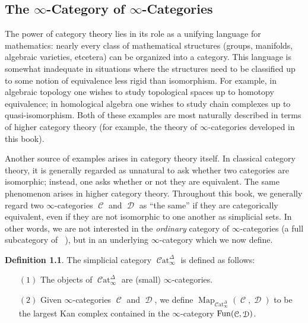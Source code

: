 \documentclass{report}[10pt, final]
\DeclareMathOperator{\bHom}{{Map}}
\DeclareMathOperator{\sSet}{\mathcal{S}et_{\Delta}}
\DeclareMathOperator{\Cat}{\mathcal{C}at}
\DeclareMathOperator{\calC}{\mathcal{C}}
\DeclareMathOperator{\calD}{\mathcal{D}}
\theoremstyle{definition}
\newtheorem{definition}[theorem]{Definition}
\begin{document}
\begin{Didn't Read}
\chapter{The $\infty$-Category of $\infty$-Categories}\label{chap4}

\setcounter{theorem}{0}
\setcounter{subsection}{0}


The power of category theory lies in its role as a unifying language for mathematics: nearly every class of mathematical structures (groups, manifolds, algebraic varieties, etcetera) can be organized into a category. This language is somewhat inadequate in situations where the 
structures need to be classified up to some notion of equivalence less rigid than isomorphism. For example, in algebraic topology one wishes to study topological spaces up to homotopy equivalence; in homological algebra one wishes to study chain complexes up to quasi-isomorphism. Both of these examples are most naturally described in terms of higher category theory (for example, the theory of $\infty$-categories developed in this book).

Another source of examples arises in category theory itself. In classical category theory, it is generally regarded as unnatural to ask whether two categories are isomorphic; instead, one asks whether or not they are equivalent. The same phenomenon arises in higher category theory. Throughout this book, we generally regard two $\infty$-categories $\calC$ and $\calD$ as ``the same'' if they are categorically equivalent, even if they are not isomorphic to one another as simplicial sets. In other words, we are not interested in the {\em ordinary} category of $\infty$-categories (a full subcategory of $\sSet$), but in an underlying $\infty$-category which we now define.

\begin{definition}\index{not}{CatinftyD@$\Cat_{\infty}^{\Delta}$}\index{not}{Catinfty@$\Cat_{\infty}$}
The simplicial category $\Cat_{\infty}^{\Delta}$ is defined as follows:
\begin{itemize}
\item[$(1)$] The objects of $\Cat_{\infty}^{\Delta}$ are (small) $\infty$-categories.

\item[$(2)$] Given $\infty$-categories $\calC$ and $\calD$, we define $\bHom_{\Cat_{\infty}^{\Delta}}(\calC,\calD)$ to be the largest Kan complex contained in the $\infty$-category $\Fun(\calC, \calD)$.
\end{itemize}


\end{definition}
\end{Didn't Read}
\end{document}
